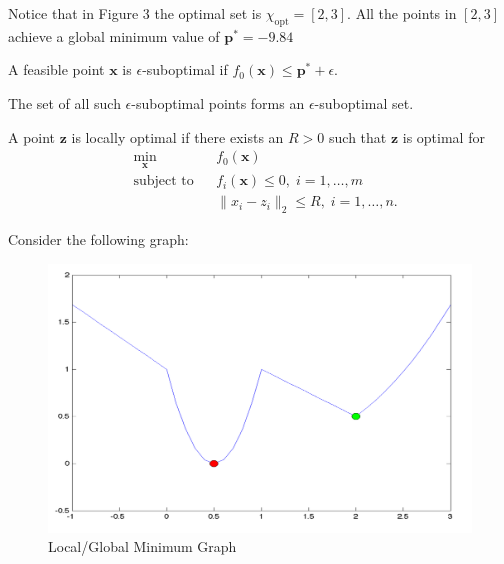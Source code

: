 \documentclass[12pt]{article}
\begin{document}
\noindent Notice that in Figure 3 the optimal set is $\chi_{\text{opt}}=[2,3]$. All the points in $[2,3]$ achieve a global minimum value of $\mathbf{p}^*=-9.84$
\begin{definition}
A feasible point $\mathbf{x}$ is $\epsilon$-suboptimal if $f_0(\mathbf{x})\leqslant \mathbf{p}^* + {\epsilon}$.
\end{definition}
\noindent The set of all such $\epsilon$-suboptimal points forms an $\epsilon$-suboptimal set.
\begin{definition}
A point $\mathbf{z}$ is locally optimal if there exists an $R>0$ such that $\mathbf{z}$ is optimal for 
\begin{equation*}
\begin{aligned}& \underset{\mathbf{x}}{\min}& & f_0(\mathbf{x}) \\& \text{subject to}& & f_i(\mathbf{x}) \leqslant 0, \; i = 1, \ldots, m \\ & & &  \|x_i-z_i\|_2\leqslant R , \; i = 1, \ldots, n.\end{aligned}\end{equation*}
\end{definition}
\noindent Consider the following graph:
\begin{figure}[h!]\begin{center}\includegraphics[scale=0.3]{figures/localminimum}\caption{Local/Global Minimum Graph}\end{center}\end{figure}
\end{document}
